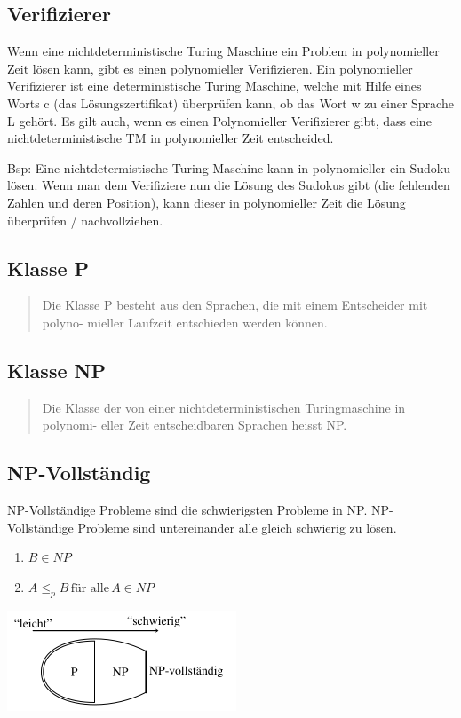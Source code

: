 \documentclass[11pt,twoside,landscape]{article}
\begin{document}
\begin{multicols}{3}
\subsection*{Verifizierer}
\label{sec:org8094230}
Wenn eine nichtdeterministische Turing Maschine ein Problem in polynomieller Zeit lösen kann, gibt es einen polynomieller Verifizieren. Ein polynomieller Verifizierer ist eine deterministische Turing Maschine, welche mit Hilfe eines Worts c (das Lösungszertifikat) überprüfen kann, ob das Wort w zu einer Sprache L gehört. Es gilt auch, wenn es einen Polynomieller Verifizierer gibt, dass eine nichtdeterministische TM in polynomieller Zeit entscheided.

Bsp: Eine nichtdetermistische Turing Maschine kann in polynomieller ein Sudoku lösen. Wenn man dem Verifiziere nun die Lösung des Sudokus gibt (die fehlenden Zahlen und deren Position), kann dieser in polynomieller Zeit die Lösung überprüfen / nachvollziehen.
\subsection*{Klasse P}
\label{sec:org5a197ae}
\begin{quote}
Die Klasse P besteht aus den Sprachen, die mit einem Entscheider mit polyno-
mieller Laufzeit entschieden werden können.
\end{quote}

\subsection*{Klasse NP}
\label{sec:org3a60fc1}
\begin{quote}
Die Klasse der von einer nichtdeterministischen Turingmaschine in polynomi-
eller Zeit entscheidbaren Sprachen heisst NP.
\end{quote}
\subsection*{NP-Vollständig}
\label{sec:orga2e9c32}
NP-Vollständige Probleme sind die schwierigsten Probleme in NP. NP-Vollständige Probleme sind untereinander alle gleich schwierig zu lösen.
\begin{enumerate}
\item \(B \in NP\)
\item \(A \leq_p B \, \text{für alle} \, A \in NP\)
\end{enumerate}

\begin{center}
\includegraphics[width=.9\linewidth]{static/img/autospr/p_np_np_vollstaendig.png}
\end{center} 


\end{multicols}
\end{document}
